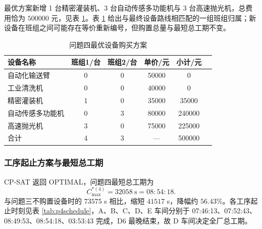 \documentclass[12pt,a4paper]{article}
\begin{document}
最优方案新增 1 台精密灌装机、3 台自动传感多功能机与 3 台高速抛光机，总费用恰为 $500000$ 元，见表 \ref{tab:p4buy}。表 \ref{tab:p4buy} 给出与最终设备路线相匹配的一组班组归属；新设备在班组之间可能存在等价重新编号，但购置总量与最短总工期不变。

\begin{table}[H]
\centering
\caption{问题四最优设备购买方案}
\small
\label{tab:p4buy}
\begin{tabular}{lccccc}
\toprule
设备名称 & 班组1/台 & 班组2/台 & 单价/元 & 小计/元 \\
\midrule
自动化输送臂 & 0 & 0 & 50000 & 0 \\
工业清洗机 & 0 & 0 & 40000 & 0 \\
精密灌装机 & 1 & 0 & 35000 & 35000 \\
自动传感多功能机 & 0 & 3 & 80000 & 240000 \\
高速抛光机 & 3 & 0 & 75000 & 225000 \\
\midrule
合计 & 4 & 3 & — & 500000 \\
\bottomrule
\end{tabular}
\end{table}

\subsubsection{工序起止方案与最短总工期}

CP-SAT 返回 OPTIMAL，问题四最短总工期为
\begin{equation}
C_{\max}^{*(4)}=32058\ \text{s}=08:54:18 .
\end{equation}
与问题三不购置设备时的 $73575$ s 相比，缩短 $41517$ s，降幅约 $56.43\%$。各工序起止时刻见表 \ref{tab:p4schedule}，A、B、C、D、E 车间分别于 07:46:13、07:52:43、08:49:53、08:54:18、03:53:43 完成，D6 最晚结束，故 D 车间决定全厂总工期。
\end{document}
